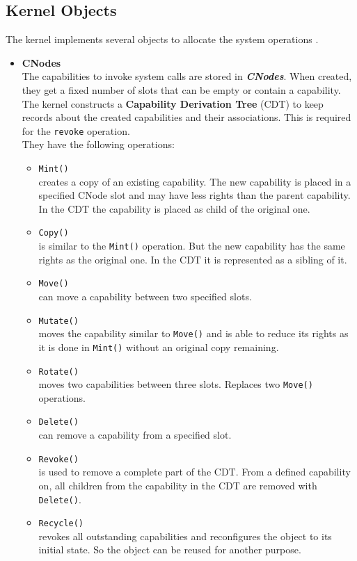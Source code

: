 \subsection{Kernel Objects}\label{sec:KernelObjects}
The kernel implements several objects to allocate the system operations \cite{Manual}.
\begin{itemize}
\item \textbf{CNodes} \\
The capabilities to invoke system calls are stored in \textbf{\textit{CNodes}}. When created, they get a fixed number of slots that can be empty or contain a capability. 
The kernel constructs a \textbf{Capability Derivation Tree} (CDT) to keep records about the created capabilities and their associations. This is required for the \texttt{revoke} operation. \\ 
They have the following operations:
\begin{itemize}
\item \texttt{Mint()} \\
creates a copy of an existing capability. The new capability is placed in a specified CNode slot and may have less rights than the parent capability. In the CDT the capability is placed as child of the original one. 
\item \texttt{Copy()} \\
is similar to the \texttt{Mint()} operation. But the new capability has the same rights as the original one. In the CDT it is represented as a sibling of it. 
\item \texttt{Move()} \\
can move a capability between two specified slots. 
\item \texttt{Mutate()} \\
moves the capability similar to \texttt{Move()} and is able to reduce its rights as it is done in \texttt{Mint()} without an original copy remaining.
\item \texttt{Rotate()} \\
moves two capabilities between three slots. Replaces two \texttt{Move()} operations. 
\item \texttt{Delete()} \\
can remove a capability from a specified slot.
\item \texttt{Revoke()} \\
is used to remove a complete part of the CDT. From a defined capability on, all children from the capability in the CDT are removed with \texttt{Delete()}. 
\item \texttt{Recycle()} \\
revokes all outstanding capabilities and reconfigures the object to its initial state. So the object can be reused for another purpose.
\end{itemize}


\end{itemize}
